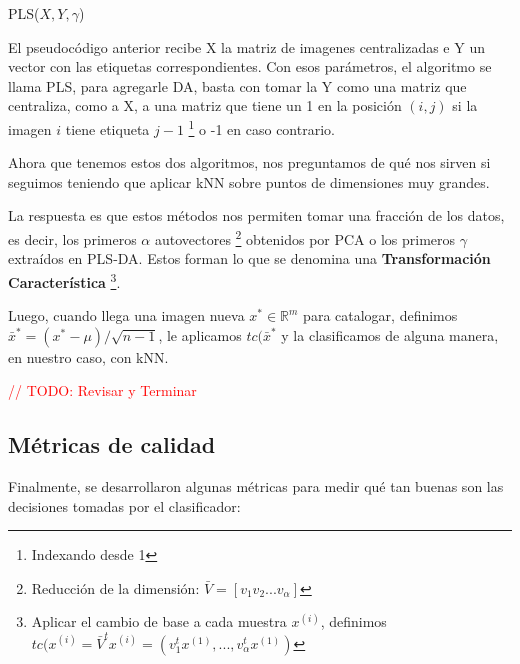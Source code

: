 \begin{algorithm}
\begin{algorithmic}[1]
 
\ENDFOR
{}
\end{algorithmic}
\caption{PLS($X, Y, \gamma$)}
\end{algorithm}

El pseudoc\'odigo anterior recibe X la matriz de imagenes centralizadas e Y un vector con las etiquetas correspondientes. Con esos par\'ametros, el algoritmo se llama PLS, para agregarle DA, basta con tomar la Y como una matriz que centraliza, como a X, a una matriz que tiene un 1 en la posici\'on $(i, j)$ si la imagen $i$ tiene etiqueta $j-1$ \footnote{Indexando desde 1} o -1 en caso contrario.

Ahora que tenemos estos dos algoritmos, nos preguntamos de qu\'e nos sirven si seguimos teniendo que aplicar kNN sobre puntos de dimensiones muy grandes.

La respuesta es que estos m\'etodos nos permiten tomar una fracci\'on de los datos, es decir, los primeros $\alpha$ autovectores \footnote{Reducci\'on de la dimensi\'on: $\bar{V} = [v_{1} v_{2} ... v_{\alpha}]$} obtenidos por PCA o los primeros $\gamma$ extra\'idos en PLS-DA. Estos forman lo que se denomina una \textbf{Transformaci\'on Caracter\'istica} \footnote{Aplicar el cambio de base a cada muestra $x^{(i)}$, definimos $tc(x^{(i)} = \bar{V}^{t}x^{(i)} = (v_{1}^{t}x^{(1)}, ..., v_{\alpha}^{t}x^{(1)})$}.

Luego, cuando llega una imagen nueva $x^{*} \in \mathbb{R}^{m}$ para catalogar, definimos $\bar{x}^{*} = (x^{*} - \mu)/\sqrt{n-1}$, le aplicamos $tc(\bar{x}^{*}$ y la clasificamos de alguna manera, en nuestro caso, con kNN.

\textcolor{red}{// TODO: Revisar y Terminar}

\subsection{M\'etricas de calidad}

Finalmente, se desarrollaron algunas m\'etricas para medir qu\'e tan buenas son las decisiones tomadas por el clasificador:

